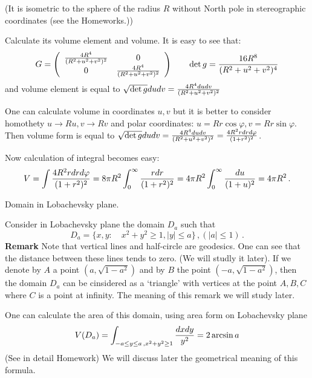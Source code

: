\documentclass[12pt]{article}
\theoremstyle{theorem}
\numberwithin{equation}{section}
\begin{document}
(It is isometric to the sphere of the radius $R$ without 
North pole in stereographic coordinates (see the Homeworks.))

   Calculate its volume element and volume.
            It is easy to see that:
                    \begin{equation}\label{}
    G=\left(
    \begin{array}{cc}
  {4R^4\over (R^2+u^2+v^2)^2} & 0 \\
  0&  {4R^4\over (R^2+u^2+v^2)^2} \\
\end{array}
\right)
\qquad
  \det g= {16R^8\over (R^2+u^2+v^2)^4}
\end{equation}
and volume element is equal to  $\sqrt {\det g}dudv= 
{4R^4dudv\over (R^2+u^2+v^2)^2}$

One can calculate volume in coordinates $u,v$ but it is better to
consider homothety  $u\to Ru, v\to Rv$ and polar coordinates:
$u=Rr\cos\varphi, v=Rr\sin\varphi$.
Then volume form is equal to
$\sqrt {\det g}dudv= 
{4R^4dudv\over (R^2+u^2+v^2)^2}={4R^2rdr d \varphi\over (1+r^2)^2}$.

Now calculation of integral becomes easy:
                  $$
    V=\int   {4R^2rdr d \varphi\over (1+r^2)^2}=8\pi R^2 \int_0^\infty {rdr\over (1+r^2)^2}=
                  4\pi  R^2 \int_0^\infty {du\over (1+u)^2}=4\pi R^2\,.
                  $$
\medskip

   Domain in Lobachevsky plane.

    Consider in Lobachevsky plane the domain $D_a$ such that
                            \begin{equation}\label
          {triangleinlobachevskyplane}
               D_a=\{x,y\colon \quad   x^2+y^2\geq 1, |y|\leq a\}\,, 
                 (|a|\leq 1)\,.
                            \end{equation}
 {\bf Remark} Note that vertical lines and half-circle are geodesics.
   One can see that the distance between these lines tends to zero.
   (We will studly it later). If we 
denote by $A$ a point $(a,\sqrt {1-a^2})$ and by $B$ the point 
 $(-a,\sqrt {1-a^2})$, then the domain $D_a$ can be cinsidered
as a `triangle' with vertices at the point $A,B,C$ where $C$
is a point at infinity. The meaning of this remark we will study later.


   One can calculate the area of this domain, using area
form on Lobachevsky plane
                                \begin{equation}\label{areaoftirangle}
        V(D_a)=\int_{-a\leq y\leq a\,, x^2+y^2\geq 1}{dxdy\over y^2}=
                  2\arcsin{a}
                   \end{equation}
(See in detail Homework)
  We will discuss later the geometrical meaning of this formula.
\end{document}
